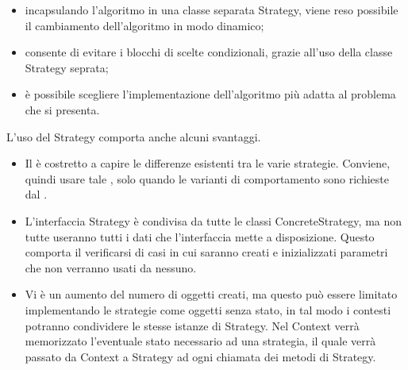 		\begin{itemize}
			\item incapsulando l'algoritmo in una classe separata Strategy, viene reso possibile il cambiamento dell'algoritmo in modo dinamico;
			\item consente di evitare i blocchi di scelte condizionali, grazie all'uso della classe Strategy seprata;
			\item è possibile scegliere l'implementazione dell'algoritmo più adatta al problema che si presenta.
		\end{itemize}
		L'uso del  Strategy comporta anche alcuni svantaggi. 
		\begin{itemize}
			\item Il  è costretto a capire le differenze esistenti tra le varie strategie. Conviene, quindi usare tale , solo quando le varianti di comportamento sono richieste dal .
			\item L'interfaccia Strategy è condivisa da tutte le classi ConcreteStrategy, ma non tutte useranno tutti i dati che l'interfaccia mette a disposizione. Questo comporta il verificarsi di casi in cui saranno creati e inizializzati parametri che non verranno usati da nessuno.
			\item Vi è un aumento del numero di oggetti creati, ma questo può essere limitato implementando le strategie come oggetti senza stato, in tal modo i contesti potranno condividere le stesse istanze di Strategy. Nel Context verrà memorizzato l'eventuale stato necessario ad una strategia, il quale verrà passato da Context a Strategy ad ogni chiamata dei metodi di Strategy.
		\end{itemize}

